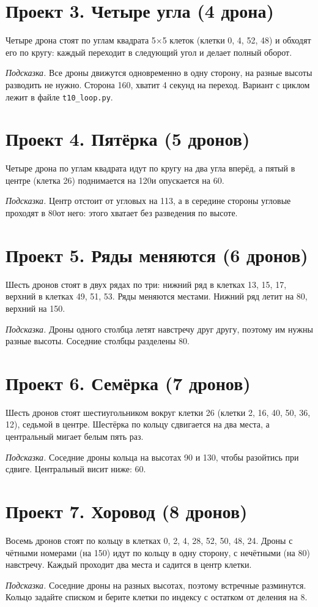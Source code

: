 \section{Проект 3. Четыре угла (4 дрона)}

Четыре дрона стоят по углам квадрата 5$\times$5 клеток (клетки 0, 4, 52, 48) и обходят его по кругу: каждый переходит в следующий угол и делает полный оборот.

\emph{Подсказка.} Все дроны движутся одновременно в одну сторону, на разные высоты разводить не нужно. Сторона 160\cm, хватит 4 секунд на переход. Вариант с циклом лежит в файле \texttt{t10\_loop.py}.

\section{Проект 4. Пятёрка (5 дронов)}

Четыре дрона по углам квадрата идут по кругу на два угла вперёд, а пятый в центре (клетка 26) поднимается на 120\cm и опускается на 60\cm.

\emph{Подсказка.} Центр отстоит от угловых на 113\cm, а в середине стороны угловые проходят в 80\cm от него: этого хватает без разведения по высоте.

\section{Проект 5. Ряды меняются (6 дронов)}

Шесть дронов стоят в двух рядах по три: нижний ряд в клетках 13, 15, 17, верхний в клетках 49, 51, 53. Ряды меняются местами. Нижний ряд летит на 80\cm, верхний на 150\cm.

\emph{Подсказка.} Дроны одного столбца летят навстречу друг другу, поэтому им нужны разные высоты. Соседние столбцы разделены 80\cm.

\section{Проект 6. Семёрка (7 дронов)}

Шесть дронов стоят шестиугольником вокруг клетки 26 (клетки 2, 16, 40, 50, 36, 12), седьмой в центре. Шестёрка по кольцу сдвигается на два места, а центральный мигает белым пять раз.

\emph{Подсказка.} Соседние дроны кольца на высотах 90 и 130\cm, чтобы разойтись при сдвиге. Центральный висит ниже: 60\cm.

\section{Проект 7. Хоровод (8 дронов)}

Восемь дронов стоят по кольцу в клетках 0, 2, 4, 28, 52, 50, 48, 24. Дроны с чётными номерами (на 150\cm) идут по кольцу в одну сторону, с нечётными (на 80\cm) навстречу. Каждый проходит два места и садится в центр клетки.

\emph{Подсказка.} Соседние дроны на разных высотах, поэтому встречные разминутся. Кольцо задайте списком и берите клетки по индексу с остатком от деления на 8.

